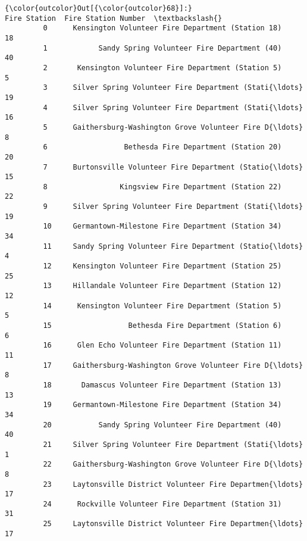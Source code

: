 \documentclass[11pt]{article}
\begin{document}
\begin{Verbatim}[commandchars=\\\{\}]
{\color{outcolor}Out[{\color{outcolor}68}]:}                                             Fire Station  Fire Station Number  \textbackslash{}
         0      Kensington Volunteer Fire Department (Station 18)                   18   
         1            Sandy Spring Volunteer Fire Department (40)                   40   
         2       Kensington Volunteer Fire Department (Station 5)                    5   
         3      Silver Spring Volunteer Fire Department (Stati{\ldots}                   19   
         4      Silver Spring Volunteer Fire Department (Stati{\ldots}                   16   
         5      Gaithersburg-Washington Grove Volunteer Fire D{\ldots}                    8   
         6                  Bethesda Fire Department (Station 20)                   20   
         7      Burtonsville Volunteer Fire Department (Statio{\ldots}                   15   
         8                 Kingsview Fire Department (Station 22)                   22   
         9      Silver Spring Volunteer Fire Department (Stati{\ldots}                   19   
         10     Germantown-Milestone Fire Department (Station 34)                   34   
         11     Sandy Spring Volunteer Fire Department (Statio{\ldots}                    4   
         12     Kensington Volunteer Fire Department (Station 25)                   25   
         13     Hillandale Volunteer Fire Department (Station 12)                   12   
         14      Kensington Volunteer Fire Department (Station 5)                    5   
         15                  Bethesda Fire Department (Station 6)                    6   
         16      Glen Echo Volunteer Fire Department (Station 11)                   11   
         17     Gaithersburg-Washington Grove Volunteer Fire D{\ldots}                    8   
         18       Damascus Volunteer Fire Department (Station 13)                   13   
         19     Germantown-Milestone Fire Department (Station 34)                   34   
         20           Sandy Spring Volunteer Fire Department (40)                   40   
         21     Silver Spring Volunteer Fire Department (Stati{\ldots}                    1   
         22     Gaithersburg-Washington Grove Volunteer Fire D{\ldots}                    8   
         23     Laytonsville District Volunteer Fire Departmen{\ldots}                   17   
         24      Rockville Volunteer Fire Department (Station 31)                   31   
         25     Laytonsville District Volunteer Fire Departmen{\ldots}                   17   

\end{Verbatim}
\end{document}
